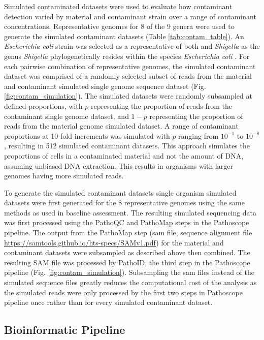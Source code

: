 \documentclass[fleqn,10pt,lineno]{wlpeerj}\usepackage[]{graphicx}\usepackage[]{color}
\begin{document}
Simulated contaminated datasets were used to evaluate how contaminant detection varied by material and contaminant strain over a range of contaminant concentrations.
Representative genomes for 8 of the 9 genera were used to generate the simulated contaminant datasets (Table \ref{tab:contam_table}).
An \textit{Escherichia coli} strain was selected as a representative of both  and \textit{Shigella} as the genus \textit{Shigella} phylogenetically resides within the species \textit{Escherichia coli} \citep{lan2002escherichia}.
For each pairwise combination of representative genomes, the simulated contaminant dataset was comprised of a randomly selected subset of reads from the material and contaminant simulated single genome sequence dataset (Fig. \ref{fig:contam_simulation}).
The simulated datasets were randomly subsampled at defined proportions, with $p$ representing the proportion of reads from the contaminant single genome dataset, and $1-p$ representing the proportion of reads from the material genome simulated dataset.
A range of contaminant proportions at 10-fold increments was simulated with $p$ ranging from $10^{-1}$ to $10^{-8}$, resulting in 512 simulated contaminant datasets.
This approach simulates the proportions of cells in a contaminated material and not the amount of DNA, assuming unbiased DNA extraction. 
This results in organisms with larger genomes having more simulated reads.  


To generate the simulated contaminant datasets single organism simulated datasets were first generated for the 8 representative genomes using the same methods as used in baseline assessment.
The resulting simulated sequencing data was first processed using the PathoQC and PathoMap steps in the Pathoscope pipeline.
The output from the PathoMap step (sam file, sequence alignment file \url{https://samtools.github.io/hts-specs/SAMv1.pdf}) for the material and contaminant datasets were subsampled as described above then combined. 
The resulting SAM file was processed by PathoID, the third step in the Pathoscope pipeline (Fig. \ref{fig:contam_simulation}).
Subsampling the sam files instead of the simulated sequence files greatly reduces the computational cost of the analysis as the simulated reads were only processed by the first two steps in Pathoscope pipeline once rather than for every simulated contaminant dataset.


\subsection*{Bioinformatic Pipeline}
\end{document}
